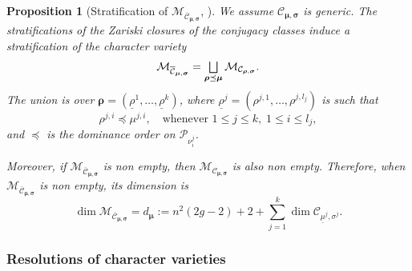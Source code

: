 \documentclass[11pt]{article}
\let\oldbigsqcup\bigsqcup
\renewcommand{\bigsqcup}{\mathop{\textstyle\oldbigsqcup}\displaylimits}
\theoremstyle{definition}
\theoremstyle{plain}
\newtheorem{proposition}[definition]{Proposition}
\newcommand{\Part}{\mathcal{P}}
\begin{document}
\begin{proposition}[Stratification of $\mathcal{M}_{\overline{\mathcal{C}}_{\boldsymbol{\mu},\boldsymbol{\sigma}}}$, {\cite[Cor.\,3.6]{Letellier13}}]\label{prop_strat}
We assume $\mathcal{C}_{\boldsymbol{\mu},\boldsymbol{\sigma}}$ is generic. The stratifications of the Zariski closures of the conjugacy classes induce a stratification of the character variety
\[
\mathcal{M}_{\overline{\mathcal{C}}_{\boldsymbol{\mu},\boldsymbol{\sigma}}}=\bigsqcup_{\boldsymbol{\rho}\preceq\boldsymbol{\mu}} \mathcal{M}_{\mathcal{C}_{\boldsymbol{\rho},\boldsymbol{\sigma}}}.
\]
The union is over $\boldsymbol{\rho} =(\underline{\rho}^{1},\dots,\underline{\rho}^{k})$, where $\underline{\rho}^j=\left(\rho^{j,1},\dots,\rho^{j,l_j}\right)$ is such that
\[
\rho^{j,i}\preceq \mu^{j,i},\quad\text{whenever }1\le j \le k,\; 1\le i \le l_j,
\]
and $\preceq$ is the dominance order on $\Part_{\nu^j_i}$.

Moreover, if $\mathcal{M}_{\overline{\mathcal{C}}_{\boldsymbol{\mu},\boldsymbol{\sigma}}}$ is non empty, then $\mathcal{M}_{\mathcal{C}_{\boldsymbol{\mu},\boldsymbol{\sigma}}}$ is also non empty. Therefore, when $\mathcal{M}_{\overline{\mathcal{C}}_{\boldsymbol{\mu},\boldsymbol{\sigma}}}$ is non empty, its dimension is
\begin{equation}\label{eq_dim_MC}
\dim \mathcal{M}_{\overline{\mathcal{C}}_{\boldsymbol{\mu},\boldsymbol{\sigma}}} = d_{\boldsymbol{\mu}}:=n^2 (2 g-2) +2 +\sum_{j=1}^k \dim \mathcal{C}_{\underline{\mu}^j,\sigma^j }.
\end{equation}
\end{proposition}

\subsubsection{Resolutions of character varieties}\label{subsect_resolution_character}
\end{document}
